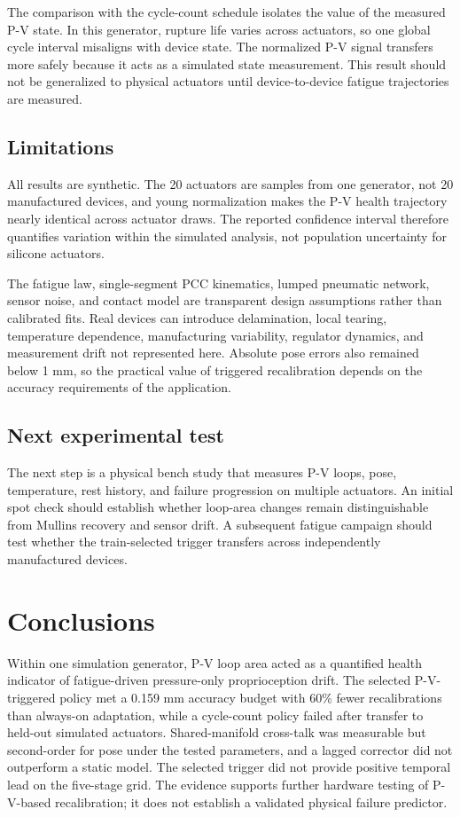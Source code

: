 \documentclass[preprints,article,submit,oneauthor]{Definitions/mdpi}
\begin{document}
The comparison with the cycle-count schedule isolates the value of the measured P-V state. In this generator, rupture life varies across actuators, so one global cycle interval misaligns with device state. The normalized P-V signal transfers more safely because it acts as a simulated state measurement. This result should not be generalized to physical actuators until device-to-device fatigue trajectories are measured.

\subsection{Limitations}

All results are synthetic. The 20 actuators are samples from one generator, not 20 manufactured devices, and young normalization makes the P-V health trajectory nearly identical across actuator draws. The reported confidence interval therefore quantifies variation within the simulated analysis, not population uncertainty for silicone actuators.

The fatigue law, single-segment PCC kinematics, lumped pneumatic network, sensor noise, and contact model are transparent design assumptions rather than calibrated fits. Real devices can introduce delamination, local tearing, temperature dependence, manufacturing variability, regulator dynamics, and measurement drift not represented here. Absolute pose errors also remained below 1 mm, so the practical value of triggered recalibration depends on the accuracy requirements of the application.

\subsection{Next experimental test}

The next step is a physical bench study that measures P-V loops, pose, temperature, rest history, and failure progression on multiple actuators. An initial spot check should establish whether loop-area changes remain distinguishable from Mullins recovery and sensor drift. A subsequent fatigue campaign should test whether the train-selected trigger transfers across independently manufactured devices.

\section{Conclusions}

Within one simulation generator, P-V loop area acted as a quantified health indicator of fatigue-driven pressure-only proprioception drift. The selected P-V-triggered policy met a 0.159 mm accuracy budget with 60\% fewer recalibrations than always-on adaptation, while a cycle-count policy failed after transfer to held-out simulated actuators. Shared-manifold cross-talk was measurable but second-order for pose under the tested parameters, and a lagged corrector did not outperform a static model. The selected trigger did not provide positive temporal lead on the five-stage grid. The evidence supports further hardware testing of P-V-based recalibration; it does not establish a validated physical failure predictor.
\end{document}
